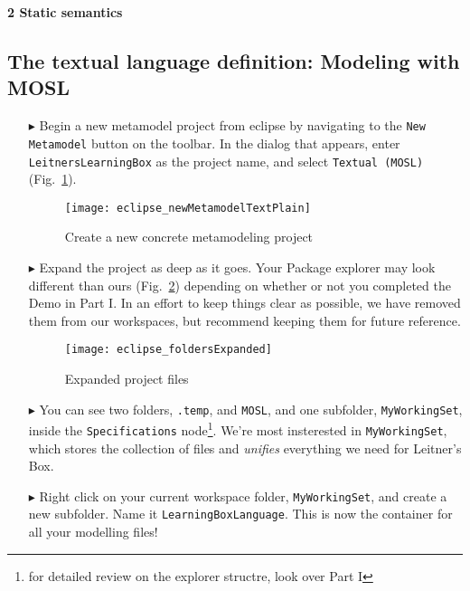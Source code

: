 \newpage
\texHeader
{\bf \Large 2 \hspace{0.5cm}Static semantics}
\subsection{The textual language definition: Modeling with MOSL}
\hypertarget{sec:static tex}{}

\begin{itemize}

\item[$\blacktriangleright$] \hypertarget{static tex}{Begin a} new metamodel project from eclipse by navigating to the \texttt{New Metamodel} button on the
toolbar. In the dialog that appears, enter \texttt{LeitnersLearningBox} as the project name, and select \texttt{Textual (MOSL)}  (Fig.~\ref{fig:new_project}).

\begin{figure}[htbp]
	\centering
  \texttt{[image: eclipse\_newMetamodelTextPlain]}
	\caption{Create a new concrete metamodeling project}
	\label{fig:new_project}
\end{figure}

\item[$\blacktriangleright$] Expand the project as deep as it goes. Your Package explorer may look different than ours (Fig.~\ref{fig:expanded_folders})
depending on whether or not you completed the Demo in Part I. In an effort to keep things clear as possible, we have removed them from our workspaces, but
recommend keeping them for future reference.

\begin{figure}[htbp]
	\centering
  \texttt{[image: eclipse\_foldersExpanded]}
	\caption{Expanded project files}
	\label{fig:expanded_folders}
\end{figure} 

\item[$\blacktriangleright$] You can see two folders, \texttt{.temp}, and \texttt{MOSL}, and one subfolder, \texttt{MyWorkingSet}, inside the
\texttt{Specifications} node\footnote{for detailed review on the explorer structre, look over Part I}. We're most insterested in \texttt{MyWorkingSet}, which
stores the collection of files and  \emph{unifies} everything we need for Leitner's Box.

\item[$\blacktriangleright$] Right click on your current workspace folder, \texttt{MyWorkingSet}, and create a new subfolder. Name it
\texttt{LearningBoxLanguage}. This is now the container for all your modelling files!



\end{itemize}

